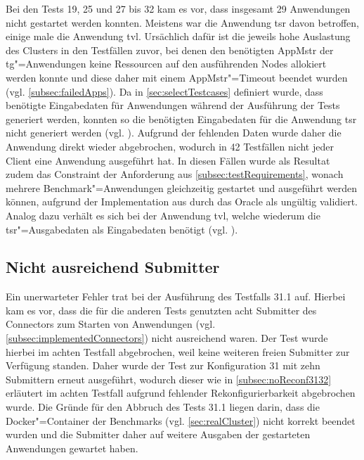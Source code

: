Bei den Tests 19, 25 und 27 bis 32 kam es vor, dass insgesamt 29 Anwendungen nicht gestartet werden konnten.
Meistens war die Anwendung \acl{tsr} davon betroffen, einige male die Anwendung \acl{tvl}.
Ursächlich dafür ist die jeweils hohe Auslastung des Clusters in den Testfällen zuvor, bei denen den benötigten \ac{AppMstr} der \acl{tg}"=Anwendungen keine Ressourcen auf den ausführenden Nodes allokiert werden konnte und diese daher mit einem \ac{AppMstr}"=Timeout beendet wurden (vgl. \cref{subsec:failedApps}).
Da in \cref{sec:selectTestcases} definiert wurde, dass benötigte Eingabedaten für Anwendungen während der Ausführung der Tests generiert werden, konnten so die benötigten Eingabedaten für die Anwendung \acl{tsr} nicht generiert werden (vgl. ).
Aufgrund der fehlenden Daten wurde daher die Anwendung direkt wieder abgebrochen, wodurch in 42 Testfällen nicht jeder Client eine Anwendung ausgeführt hat.
In diesen Fällen wurde als Resultat zudem das Constraint der Anforderung aus \cref{subsec:testRequirements}, wonach mehrere Benchmark"=Anwendungen gleichzeitig gestartet und ausgeführt werden können, aufgrund der Implementation aus  durch das Oracle als ungültig validiert.
Analog dazu verhält es sich bei der Anwendung \acl{tvl}, welche wiederum die \acl{tsr}"=Ausgabedaten als Eingabedaten benötigt (vgl. ).

\subsection{Nicht ausreichend Submitter}
\label{subsec:notEnoughSubmitter}

Ein unerwarteter Fehler trat bei der Ausführung des Testfalls 31.1 auf.
Hierbei kam es vor, dass die für die anderen Tests genutzten acht Submitter des Connectors zum Starten von Anwendungen (vgl. \cref{subsec:implementedConnectors}) nicht ausreichend waren.
Der Test wurde hierbei im achten Testfall abgebrochen, weil keine weiteren freien Submitter zur Verfügung standen.
Daher wurde der Test zur Konfiguration 31 mit zehn Submittern erneut ausgeführt, wodurch dieser wie in \cref{subsec:noReconf3132} erläutert im achten Testfall aufgrund fehlender Rekonfigurierbarkeit abgebrochen wurde.
Die Gründe für den Abbruch des Tests 31.1 liegen darin, dass die Docker"=Container der Benchmarks (vgl. \cref{sec:realCluster}) nicht korrekt beendet wurden und die Submitter daher auf weitere Ausgaben der gestarteten Anwendungen gewartet haben.
